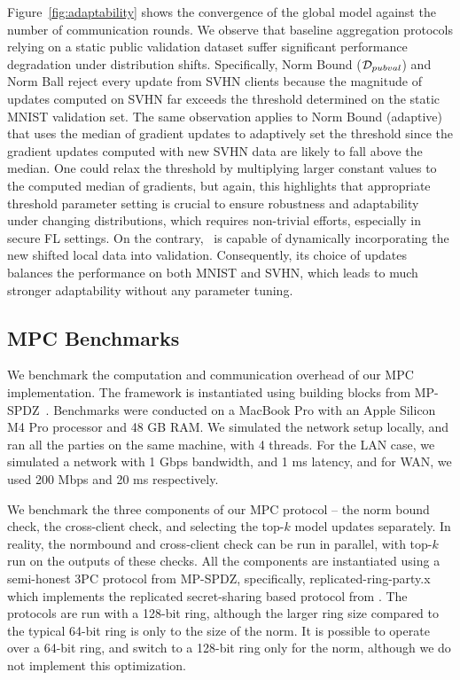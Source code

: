 Figure~\ref{fig:adaptability} shows the convergence of the global model against the number of communication rounds.
We observe that baseline aggregation protocols relying on a static public validation dataset suffer significant performance degradation under distribution shifts.
Specifically, Norm Bound ($\mathcal{D}_{pubval}$) and Norm Ball reject every update from SVHN clients because the magnitude of updates computed on SVHN far exceeds the threshold determined on the static MNIST validation set.
The same observation applies to Norm Bound (adaptive) that uses the median of gradient updates to adaptively set the threshold since the gradient updates computed with new SVHN data are likely to fall above the median. One could relax the threshold by multiplying larger constant values to the computed median of gradients, but again, this highlights that appropriate threshold parameter setting is crucial to ensure robustness and adaptability under changing distributions, which requires non-trivial efforts, especially in secure FL settings.
On the contrary, \ours~is capable of dynamically incorporating the new shifted local data into validation. Consequently, its choice of updates balances the performance on both MNIST and SVHN, which leads to much stronger adaptability without any parameter tuning.



\subsection{MPC Benchmarks}
\label{sec: mpc-benchmark}
We benchmark the computation and communication overhead of our MPC implementation. The framework is instantiated using building blocks from MP-SPDZ~\cite{CCS:Keller20}. Benchmarks were conducted on a MacBook Pro with an Apple Silicon M4 Pro processor and 48 GB RAM. We simulated the network setup locally, and ran all the parties on the same machine, with 4 threads. For the LAN case, we simulated a network with 1 Gbps bandwidth, and 1 ms latency, and for WAN, we used 200 Mbps and 20 ms respectively.

We benchmark the three components of our MPC protocol -- the norm bound check, the cross-client check, and selecting the top-$k$ model updates separately. In reality, the normbound and cross-client check can be run in parallel, with top-$k$ run on the outputs of these checks. All the components are instantiated using a semi-honest 3PC protocol from MP-SPDZ, specifically, replicated-ring-party.x which implements the replicated secret-sharing based protocol from \cite{CCS:AFLNO16}. The protocols are run with a 128-bit ring, although the larger ring size compared to the typical 64-bit ring is only to the size of the norm. It is possible to operate over a 64-bit ring, and switch to a 128-bit ring only for the norm, although we do not implement this optimization. 

